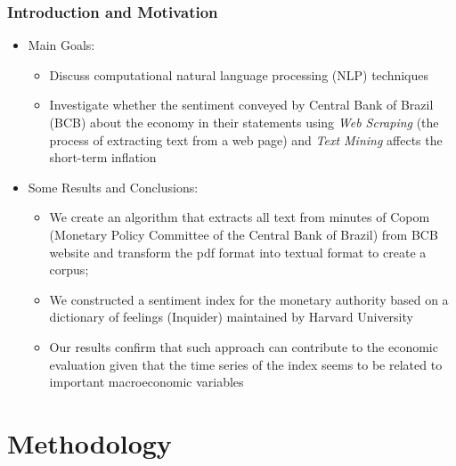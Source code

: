 \documentclass[aspectratio=169]{beamer}
\begin{document}
\begin{frame}\frametitle{Introduction and Motivation}
  \begin{itemize}
  \item Main Goals:
    \begin{itemize}
    	\item Discuss computational natural
    	language processing (NLP) techniques
    	\item Investigate whether the
    	sentiment conveyed by Central Bank of Brazil (BCB) about the economy in their statements using \emph{Web Scraping} (the process of extracting text from a web page) and \emph{Text Mining} affects the short-term inflation 
    \end{itemize}
  \item Some Results and Conclusions:
    \begin{itemize}
      \item We create an algorithm that extracts all text from minutes of Copom (Monetary Policy Committee of the Central Bank of Brazil) from BCB website and transform the pdf format into textual format to create a corpus;
      \item We constructed a sentiment index for the monetary authority based on a dictionary of feelings (Inquider) maintained by Harvard
      University
      \item Our results confirm that such approach can contribute to the economic evaluation given that the time series of the index seems to be related to important macroeconomic variables
    \end{itemize}
  \end{itemize}
\end{frame}


\section{Methodology}
\end{document}

